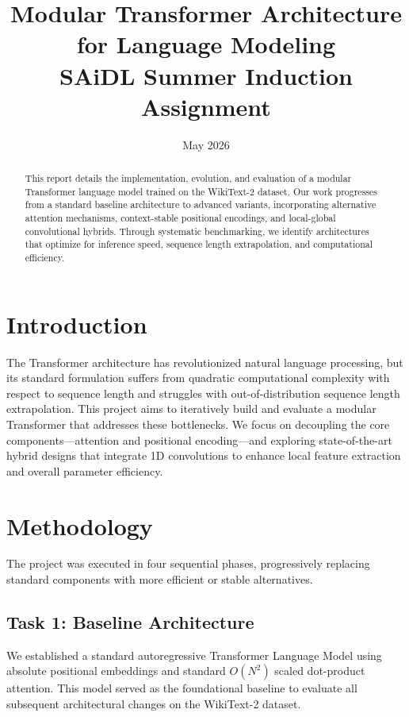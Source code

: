 \documentclass[11pt,a4paper]{article}
\title{\textbf{Modular Transformer Architecture for Language Modeling} \\ \large SAiDL Summer Induction Assignment}
\author{}
\date{May 2026}
\begin{document}
\maketitle

\tableofcontents
\newpage

\begin{abstract}
This report details the implementation, evolution, and evaluation of a modular Transformer language model trained on the WikiText-2 dataset. Our work progresses from a standard baseline architecture to advanced variants, incorporating alternative attention mechanisms, context-stable positional encodings, and local-global convolutional hybrids. Through systematic benchmarking, we identify architectures that optimize for inference speed, sequence length extrapolation, and computational efficiency.
\end{abstract}

\section{Introduction}
The Transformer architecture has revolutionized natural language processing, but its standard formulation suffers from quadratic computational complexity with respect to sequence length and struggles with out-of-distribution sequence length extrapolation. This project aims to iteratively build and evaluate a modular Transformer that addresses these bottlenecks. We focus on decoupling the core components---attention and positional encoding---and exploring state-of-the-art hybrid designs that integrate 1D convolutions to enhance local feature extraction and overall parameter efficiency.

\section{Methodology}

The project was executed in four sequential phases, progressively replacing standard components with more efficient or stable alternatives.

\subsection{Task 1: Baseline Architecture}
We established a standard autoregressive Transformer Language Model using absolute positional embeddings and standard $O(N^2)$ scaled dot-product attention. This model served as the foundational baseline to evaluate all subsequent architectural changes on the WikiText-2 dataset.
\end{document}
